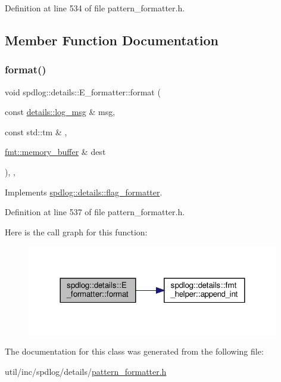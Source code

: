 Definition at line 534 of file pattern\+\_\+formatter.\+h.



\subsection{Member Function Documentation}
\mbox{\label{classspdlog_1_1details_1_1_e__formatter_a133d1ba939b743041a036eb16c2c524a}} 
\subsubsection{\texorpdfstring{format()}{format()}}
{\footnotesize\ttfamily void spdlog\+::details\+::\+E\+\_\+formatter\+::format (\begin{DoxyParamCaption}\item[{const \hyperlink{structspdlog_1_1details_1_1log__msg}{details\+::log\+\_\+msg} \&}]{msg,  }\item[{const std\+::tm \&}]{,  }\item[{\hyperlink{format_8h_a21cbf729f69302f578e6db21c5e9e0d2}{fmt\+::memory\+\_\+buffer} \&}]{dest }\end{DoxyParamCaption})\hspace{0.3cm}{\ttfamily [inline]}, {\ttfamily [override]}, {\ttfamily [virtual]}}



Implements \hyperlink{classspdlog_1_1details_1_1flag__formatter_a33fb3e42a4c8200cceb833d92b53fb67}{spdlog\+::details\+::flag\+\_\+formatter}.



Definition at line 537 of file pattern\+\_\+formatter.\+h.

Here is the call graph for this function\+:
\nopagebreak
\begin{figure}[H]
\begin{center}
\leavevmode
\includegraphics[width=312pt]{classspdlog_1_1details_1_1_e__formatter_a133d1ba939b743041a036eb16c2c524a_cgraph}
\end{center}
\end{figure}


The documentation for this class was generated from the following file\+:\begin{DoxyCompactItemize}
\item 
util/inc/spdlog/details/\hyperlink{pattern__formatter_8h}{pattern\+\_\+formatter.\+h}\end{DoxyCompactItemize}
